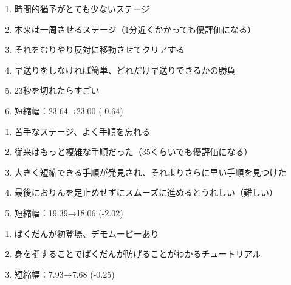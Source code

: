 \begin{enumerate}[label={\sarrow}]
\item 時間的猶予がとても少ないステージ
\item 本来は一周させるステージ（1分近くかかっても優評価になる）
\item それをむりやり反対に移動させてクリアする
\item 早送りをしなければ簡単、どれだけ早送りできるかの勝負
\item 23秒を切れたらすごい
\item 短縮幅：23.64→23.00 (-0.64)
\end{enumerate}



\begin{enumerate}[label={\sarrow}]
\item 苦手なステージ、よく手順を忘れる
\item 従来はもっと複雑な手順だった（35くらいでも優評価になる）
\item 大きく短縮できる手順が発見され、それよりさらに早い手順を見つけた
\item 最後におりんを足止めせずにスムーズに進めるとうれしい（難しい）
\item 短縮幅：19.39→18.06 (-2.02)
\end{enumerate}








\begin{enumerate}[label={\sarrow}]
\item ばくだんが初登場、デモムービーあり
\item 身を挺することでばくだんが防げることがわかるチュートリアル
\item 短縮幅：7.93→7.68 (-0.25)
\end{enumerate}




